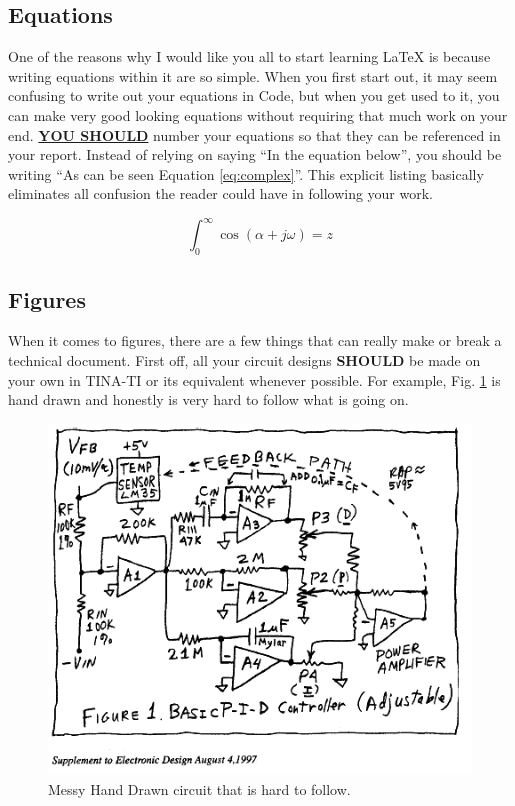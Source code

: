 \documentclass{hitec}
\begin{document}
\subsection{Equations}
One of the reasons why I would like you all to start learning LaTeX is because writing equations within it are so simple. When you first start out, it may seem confusing to write out your equations in Code, but when you get used to it, you can make very good looking equations without requiring that much work on your end. \textbf{\underline{YOU SHOULD}} number your equations so that they can be referenced in your report. Instead of relying on saying ``In the equation below'', you should be writing ``As can be seen Equation \ref{eq:complex}''. This explicit listing basically eliminates all confusion the reader could have in following your work.

\begin{equation}
\int_0^\infty \cos(\alpha + j\omega) = z
\label{eq:complex}
\end{equation}


\subsection{Figures}
When it comes to figures, there are a few things that can really make or break a technical document. First off, all your circuit designs \textbf{SHOULD} be made on your own in TINA-TI or its equivalent whenever possible. For example, Fig. \ref{fig:MessyCircuit} is hand drawn and honestly is very hard to follow what is going on.

\begin{figure}[h]
\centering
\includegraphics[scale = .5]{pease.png}
\caption{Messy Hand Drawn circuit that is hard to follow.}
\label{fig:MessyCircuit}
\end{figure}
\end{document}
